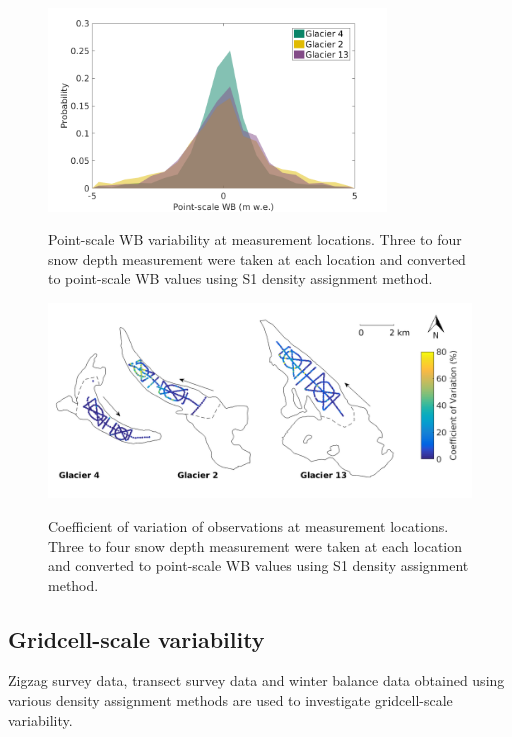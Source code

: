 \documentclass{sfuthesis}
\begin{document}
\begin{figure}
	\centering
	\includegraphics[width =0.8\textwidth]{SWEvarOneLocHIST.png}\\
	\caption{Point-scale WB variability at measurement locations. Three to four snow depth measurement were taken at each location and converted to point-scale WB values using S1 density assignment method.}
	\label{fig:SWEvar_oneloc_hist}
\end{figure}

\begin{figure}
	\centering
	\includegraphics[width =\textwidth]{Map_pointstd.png}\\
	\caption{Coefficient of variation of observations at measurement locations. Three to four snow depth measurement were taken at each location and converted to point-scale WB values using S1 density assignment method.}
	\label{fig:SWEvar_oneloc_map}
\end{figure}

\subsection{Gridcell-scale variability}

Zigzag survey data, transect survey data and winter balance data obtained using various density assignment methods are used to investigate gridcell-scale variability. 
\end{document}
